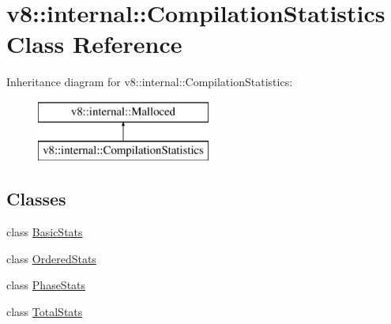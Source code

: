 \hypertarget{classv8_1_1internal_1_1_compilation_statistics}{}\section{v8\+:\+:internal\+:\+:Compilation\+Statistics Class Reference}
\label{classv8_1_1internal_1_1_compilation_statistics}
Inheritance diagram for v8\+:\+:internal\+:\+:Compilation\+Statistics\+:\begin{figure}[H]
\begin{center}
\leavevmode
\includegraphics[height=2.000000cm]{classv8_1_1internal_1_1_compilation_statistics}
\end{center}
\end{figure}
\subsection*{Classes}
\begin{DoxyCompactItemize}
\item 
class \hyperlink{classv8_1_1internal_1_1_compilation_statistics_1_1_basic_stats}{Basic\+Stats}
\item 
class \hyperlink{classv8_1_1internal_1_1_compilation_statistics_1_1_ordered_stats}{Ordered\+Stats}
\item 
class \hyperlink{classv8_1_1internal_1_1_compilation_statistics_1_1_phase_stats}{Phase\+Stats}
\item 
class \hyperlink{classv8_1_1internal_1_1_compilation_statistics_1_1_total_stats}{Total\+Stats}
\end{DoxyCompactItemize}
